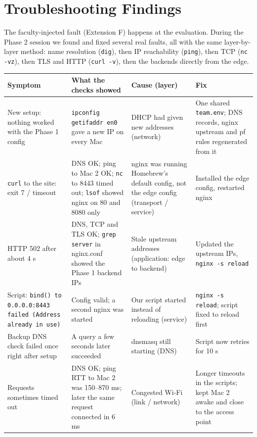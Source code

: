 \documentclass[11pt,a4paper]{article}
\begin{document}
\section{Troubleshooting Findings}
\label{sec:trouble}

The faculty-injected fault (Extension F) happens at the evaluation. During the Phase 2 session we
found and fixed several real faults, all with the same layer-by-layer method: name resolution
(\texttt{dig}), then IP reachability (\texttt{ping}), then TCP (\texttt{nc -vz}), then TLS and HTTP
(\texttt{curl -v}), then the backends directly from the edge.

\begin{table}[H]
\centering
\small
\begin{tabularx}{\linewidth}{YYYY}
\toprule
Symptom & What the checks showed & Cause (layer) & Fix \\
\midrule
New setup: nothing worked with the Phase 1 config & \texttt{ipconfig getifaddr en0} gave a new IP on every Mac &
  DHCP had given new addresses (network) & One shared \texttt{team.env}; DNS records, nginx upstream and pf rules regenerated from it \\
\texttt{curl} to the site: exit 7 / timeout & DNS OK; ping to Mac 2 OK; \texttt{nc} to 8443 timed out; \texttt{lsof} showed nginx on 80 and 8080 only &
  nginx was running Homebrew's default config, not the edge config (transport / service) & Installed the edge config, restarted nginx \\
HTTP 502 after about 4 s & DNS, TCP and TLS OK; \texttt{grep server} in nginx.conf showed the Phase 1 backend IPs &
  Stale upstream addresses (application: edge to backend) & Updated the upstream IPs, \texttt{nginx -s reload} \\
Script: \texttt{bind() to 0.0.0.0:8443 failed (Address already in use)} & Config valid; a second nginx was started &
  Our script started instead of reloading (service) & \texttt{nginx -s reload}; script fixed to reload first \\
Backup DNS check failed once right after setup & A query a few seconds later succeeded & dnsmasq still starting (DNS) & Script now retries for 10 s \\
Requests sometimes timed out & DNS OK; ping RTT to Mac 2 was 150--870 ms; later the same request connected in 6 ms &
  Congested Wi-Fi (link / network) & Longer timeouts in the scripts; kept Mac 2 awake and close to the access point \\
\bottomrule
\end{tabularx}
\end{table}
\end{document}
